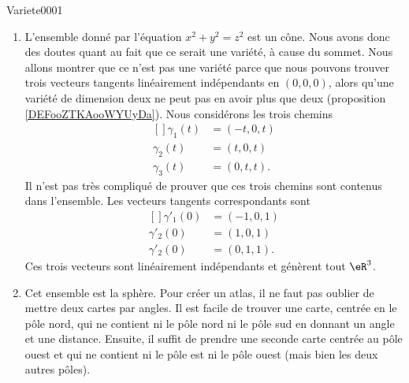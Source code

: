 \begin{corrige}{Variete0001}
\begin{enumerate}
		\item
		      L'ensemble donné par l'équation $x^2+y^2=z^2$ est un cône. Nous avons donc des doutes quant au fait que ce serait une variété, à cause du sommet.
		      Nous allons montrer que ce n'est pas une variété parce que nous pouvons trouver trois vecteurs tangents linéairement indépendants en $(0,0,0)$, alors qu'une variété de dimension deux ne peut pas en avoir plus que deux (proposition \ref{DEFooZTKAooWYUyDa}). Nous considérons les trois chemins
		      \begin{equation}
			      \begin{aligned}[]
				      \gamma_1(t) & =(-t,0,t) \\
				      \gamma_2(t) & =(t,0,t)  \\
				      \gamma_3(t) & =(0,t,t).
			      \end{aligned}
		      \end{equation}
		      Il n'est pas très compliqué de prouver que ces trois chemins sont contenus dans l'ensemble. Les vecteurs tangents correspondants sont
		      \begin{equation}
			      \begin{aligned}[]
				      \gamma'_1(0) & =(-1,0,1) \\
				      \gamma'_2(0) & =(1,0,1)  \\
				      \gamma'_2(0) & =(0,1,1).
			      \end{aligned}
		      \end{equation}
		      Ces trois vecteurs sont linéairement indépendants et génèrent tout $\eR^3$.

		\item
		      Cet ensemble est la sphère. Pour créer un atlas, il ne faut pas oublier de mettre deux cartes par angles. Il est facile de trouver une carte, centrée en le pôle nord, qui ne contient ni le pôle nord ni le pôle sud en donnant un angle et une distance. Ensuite, il suffit de prendre une seconde carte centrée au pôle ouest et qui ne contient ni le pôle est ni le pôle ouest (mais bien les deux autres pôles).


\end{enumerate}
\end{corrige}
